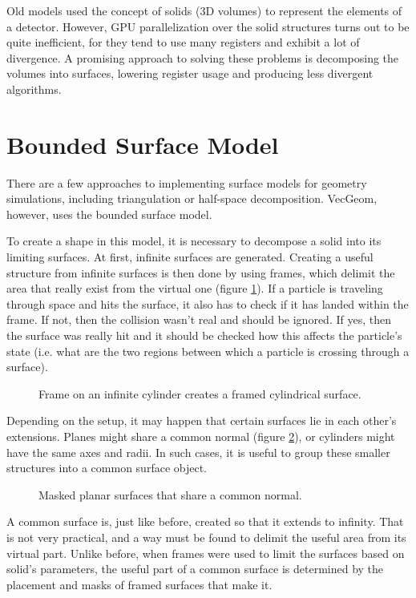 \documentclass[12pt, a4paper]{article}
\begin{document}
Old models used the concept of solids (3D volumes) to represent the elements of a detector. However, GPU parallelization over the solid structures turns out to be quite inefficient, for they tend to use many registers and exhibit a lot of divergence. A promising approach to solving these problems is decomposing the volumes into surfaces, lowering register usage and producing less divergent algorithms.


\section{Bounded Surface Model}

There are a few approaches to implementing surface models for geometry simulations, including triangulation or half-space decomposition. VecGeom, however, uses the bounded surface model.

To create a shape in this model, it is necessary to decompose a solid into its limiting surfaces. At first, infinite surfaces are generated. Creating a useful structure from infinite surfaces is then done by using frames, which delimit the area that really exist from the virtual one (figure \ref{fig:mask}). If a particle is traveling through space and hits the surface, it also has to check if it has landed within the frame. If not, then the collision wasn't real and should be ignored. If yes, then the surface was really hit and it should be checked how this affects the particle's state (i.e. what are the two regions between which a particle is crossing through a surface).
\begin{figure}[h]
	\centering
	
	\caption{Frame on an infinite cylinder creates a framed cylindrical surface.}
	\label{fig:mask}
\end{figure}

Depending on the setup, it may happen that certain surfaces lie in each other's extensions. Planes might share a common normal (figure \ref{fig:commonSurf}), or cylinders might have the same axes and radii. In such cases, it is useful to group these smaller structures into a common surface object.
\begin{figure}[h]
	\centering
	
	\caption{Masked planar surfaces that share a common normal.}
	\label{fig:commonSurf}
\end{figure}

A common surface is, just like before, created so that it extends to infinity. That is not very practical, and a way must be found to delimit the useful area from its virtual part. Unlike before, when frames were used to limit the surfaces based on solid's parameters, the useful part of a common surface is determined by the placement and masks of framed surfaces that make it.
\end{document}
